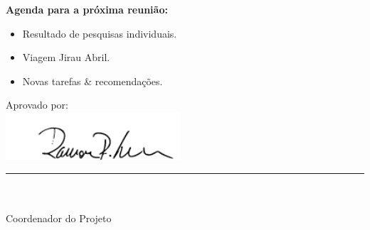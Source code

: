 \textbf{Agenda para a próxima reunião:}
	\begin{itemize}
		\item Resultado de pesquisas individuais.
	    \item Viagem Jirau Abril.
	    \item Novas tarefas \& recomendações.
	\end{itemize}


\vspace{5mm}%
\parbox[t]{70mm}{
  Aprovado por: \\[5mm]
  \centering
  \includegraphics[width=65mm]{figs/logo/assinatura-ramon.png} \\[-4mm]
  \rule[2mm]{70mm}{0.1mm} \\
  \ramon \\[1mm]
  Coordenador do Projeto \\
}

\fim


